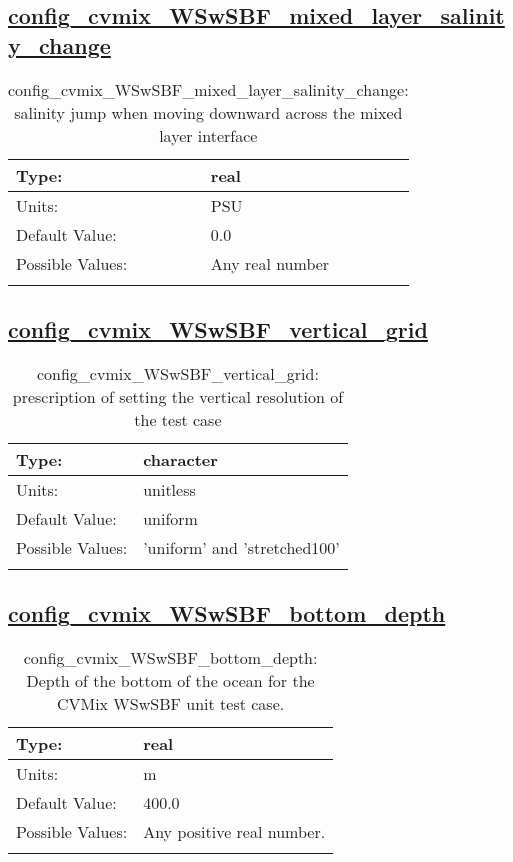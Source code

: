 \subsection[config\_cvmix\_WSwSBF\_mixed\_layer\_salinity\_change]{\hyperref[sec:nm_tab_cvmix_WSwSBF]{config\_cvmix\_WSwSBF\_mixed\_layer\_salinity\_change}}
\label{subsec:nm_sec_config_cvmix_WSwSBF_mixed_layer_salinity_change}
\begin{center}
\begin{longtable}{| p{2.0in} || p{4.0in} |}
    \hline
    Type: & real \\
    \hline
    Units: & \si{PSU} \\
    \hline
    Default Value: & 0.0 \\
    \hline
    Possible Values: & Any real number \\
    \hline
    \caption{config\_cvmix\_WSwSBF\_mixed\_layer\_salinity\_change: salinity jump when moving downward across the mixed layer interface}
\end{longtable}
\end{center}
\subsection[config\_cvmix\_WSwSBF\_vertical\_grid]{\hyperref[sec:nm_tab_cvmix_WSwSBF]{config\_cvmix\_WSwSBF\_vertical\_grid}}
\label{subsec:nm_sec_config_cvmix_WSwSBF_vertical_grid}
\begin{center}
\begin{longtable}{| p{2.0in} || p{4.0in} |}
    \hline
    Type: & character \\
    \hline
    Units: & \si{unitless} \\
    \hline
    Default Value: & uniform \\
    \hline
    Possible Values: & 'uniform' and 'stretched100' \\
    \hline
    \caption{config\_cvmix\_WSwSBF\_vertical\_grid: prescription of setting the vertical resolution of the test case}
\end{longtable}
\end{center}
\subsection[config\_cvmix\_WSwSBF\_bottom\_depth]{\hyperref[sec:nm_tab_cvmix_WSwSBF]{config\_cvmix\_WSwSBF\_bottom\_depth}}
\label{subsec:nm_sec_config_cvmix_WSwSBF_bottom_depth}
\begin{center}
\begin{longtable}{| p{2.0in} || p{4.0in} |}
    \hline
    Type: & real \\
    \hline
    Units: & \si{m} \\
    \hline
    Default Value: & 400.0 \\
    \hline
    Possible Values: & Any positive real number. \\
    \hline
    \caption{config\_cvmix\_WSwSBF\_bottom\_depth: Depth of the bottom of the ocean for the CVMix WSwSBF unit test case.}
\end{longtable}
\end{center}
